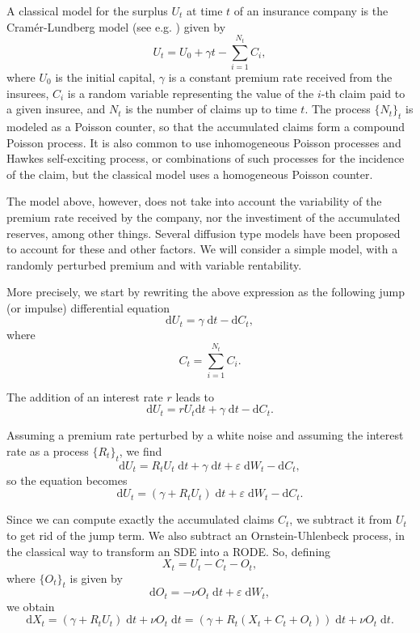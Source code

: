 \documentclass[reqno,12pt]{amsart}
\theoremstyle{plain} %
\theoremstyle{definition} %
\begin{document}
A classical model for the surplus $U_t$ at time $t$ of an insurance company is the Cram\'er-Lundberg model (see e.g. \cite{GerberShiu1998}) given by
\[
  U_t = U_0 + \gamma t - \sum_{i=1}^{N_t} C_i,
\]
where $U_0$ is the initial capital, $\gamma$ is a constant premium rate received from the insurees, $C_i$ is a random variable representing the value of the $i$-th claim paid to a given insuree, and $N_t$ is the number of claims up to time $t$. The process $\{N_t\}_t$ is modeled as a Poisson counter, so that the accumulated claims form a compound Poisson process. It is also common to use inhomogeneous Poisson processes and Hawkes self-exciting process, or combinations of such processes for the incidence of the claim, but the classical model uses a homogeneous Poisson counter.

The model above, however, does not take into account the variability of the premium rate received by the company, nor the investiment of the accumulated reserves, among other things. Several diffusion type models have been proposed to account for these and other factors. We will consider a simple model, with a randomly perturbed premium and with variable rentability.

More precisely, we start by rewriting the above expression as the following jump (or impulse) differential equation
\[
  \mathrm{d}U_t = \gamma\;\mathrm{d}t - \mathrm{d}C_t,
\]
where
\[
  C_t = \sum_{i=1}^{N_t} C_i.
\]

The addition of an interest rate $r$ leads to
\[
  \mathrm{d}U_t = r U_t \mathrm{d}t + \gamma\;\mathrm{d}t - \mathrm{d}C_t.
\]

Assuming a premium rate perturbed by a white noise and assuming the interest rate as a process $\{R_t\}_t$, we find
\[
  \mathrm{d}U_t = R_t U_t\;\mathrm{d}t + \gamma\;\mathrm{d}t + \varepsilon\;\mathrm{d}W_t - \mathrm{d}C_t,
\]
so the equation becomes
\[
  \mathrm{d}U_t = (\gamma + R_t U_t)\;\mathrm{d}t + \varepsilon\;\mathrm{d}W_t - \mathrm{d}C_t.
\]

Since we can compute exactly the accumulated claims $C_t$, we subtract it from $U_t$ to get rid of the jump term. We also subtract an Ornstein-Uhlenbeck process, in the classical way to transform an SDE into a RODE. So, defining
\[
  X_t = U_t - C_t - O_t,
\]
where $\{O_t\}_t$ is given by
\[
  \mathrm{d}O_t = -\nu O_t\;\mathrm{d}t + \varepsilon\;\mathrm{d}W_t,
\]
we obtain
\[
  \mathrm{d}X_t = (\gamma + R_t U_t)\;\mathrm{d}t + \nu O_t\;\mathrm{d}t = (\gamma + R_t (X_t + C_t + O_t))\;\mathrm{d}t + \nu O_t\;\mathrm{d}t.
\]
\end{document}
